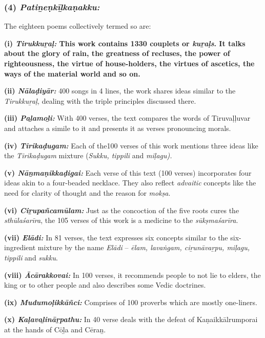 \subsubsection*{(4) \textit{Patiṉeṇkīḻkaṇakku:}}

\vskip -7pt

The eighteen poems collectively termed so are:

\textbf{(i) \textit{Tirukkuṟaḷ:} This work contains 1330 couplets or \textit{kuṟaḷs}. It talks about the glory of rain, the greatness of recluses, the power of righteousness, the virtue of house-holders, the virtues of ascetics, the ways of the material world and so on.}

\textbf{(ii) \textit{Nālaḍiyār:}} 400 songs in 4 lines, the work shares ideas similar to the \textit{Tirukkuṟaḷ,} dealing with the triple principles discussed there.

\textbf{(iii) \textit{Paḻamoḻi:}} With 400 verses, the text compares the words of Tiruvaḷḷuvar and attaches a simile to it and presents it as verses pronouncing morals.

\textbf{(iv) \textit{Tirikaḍugam:}} Each of the100 verses of this work mentions three ideas like the \textit{Tirikaḍugam} mixture (\textit{Sukku, tippili} and \textit{miḷagu).}

\textbf{(v) \textit{Nāṉmaṇikkaḍigai:}} Each verse of this text (100 verses) incorporates four ideas akin to a four-beaded necklace. They also reflect \textit{advaitic} concepts like the need for clarity of thought and the reason for \textit{mokṣa}.

\textbf{(vi) \textit{Ciṟupañcamūlam:}} Just as the concoction of the five roots cures the \textit{sthūlaśarīra}, the 105 verses of this work is a medicine to the \textit{sūkṣmaśarīra}.

\textbf{(vii) \textit{Elādi:}} In 81 verses, the text expresses six concepts similar to the six-ingredient mixture by the name \textit{Elādi} – \textit{ēlam, lavaṅgam, ciṟunāvaṟpu, miḷagu, tippili} and \textit{sukku}.

\textbf{(viii) \textit{Ācārakkovai:}} In 100 verses, it recommends people to not lie to elders, the king or to other people and also describes some Vedic doctrines.

\textbf{(ix) \textit{Mudumoḷikkāñci:}} Comprises of 100 proverbs which are mostly one-liners.

\textbf{(x) \textit{Kaḷavaḻināṟpathu:}} In 40 verse deals with the defeat of Kaṇaikkālrumporai at the hands of Cōḻa and Cēraṉ.


